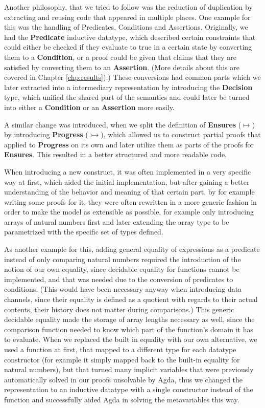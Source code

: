Another philosophy, that we tried to follow was the reduction of duplication by extracting and reusing code that appeared in multiple places. One example for this was the handling of Predicates, Conditions and Assertions. Originally, we had the \textbf{Predicate} inductive datatype, which described certain constraints that could either be checked if they evaluate to true in a certain state by converting them to a \textbf{Condition}, or a proof could be given that claims that they are satisfied by converting them to an \textbf{Assertion}. (More details about this are covered in Chapter \ref{chp:results}).) These conversions had common parts which we later extracted into a intermediary representation by introducing the \textbf{Decision} type, which unified the shared part of the semantics and could later be turned into either a \textbf{Condition} or an \textbf{Assertion} more easily.

\newpage

A similar change was introduced, when we split the definition of \textbf{Ensures} ($\mapsto$) by introducing \textbf{Progress} ($\rightarrowtail$), which allowed us to construct partial proofs that applied to \textbf{Progress} on its own and later utilize them as parts of the proofs for \textbf{Ensures}. This resulted in a better structured and more readable code.

When introducing a new construct, it was often implemented in a very specific way at first, which aided the initial implementation, but after gaining a better understanding of the behavior and meaning of that certain part, by for example writing some proofs for it, they were often rewritten in a more generic fashion in order to make the model as extensible as possible, for example only introducing arrays of natural numbers first and later extending the array type to be parametrized with the specific set of types defined.

As another example for this, adding general equality of expressions as a predicate instead of only comparing natural numbers required the introduction of the notion of our own equality, since decidable equality for functions cannot be implemented, and that was needed due to the conversion of predicates to conditions. (This would have been necessary anyway when introducing data channels, since their equality is defined as a quotient with regards to their actual contents, their history does not matter during comparisons.) This generic decidable equality made the storage of array lengths necessary as well, since the comparison function needed to know which part of the function's domain it has to evaluate. When we replaced the built in equality with our own alternative, we used a function at first, that mapped to a different type for each datatype constructor (for example it simply mapped back to the built-in equality for natural numbers), but that turned many implicit variables that were previously automatically solved in our proofs unsolvable by Agda, thus we changed the representation to an inductive datatype with a single constructor instead of the function and successfully aided Agda in solving the metavariables this way.

